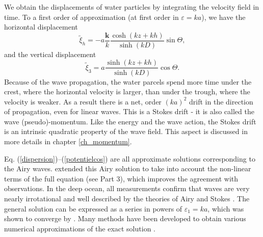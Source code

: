 We obtain the displacements of water particles by integrating the velocity field in 
time. To a first order of approximation (at first order in $\varepsilon=ka$),
we have the horizontal displacement
\begin{equation}
     \widetilde{\xi}_h = - a \frac{{\mathbf k}}{k}
    \frac{\cosh\left(kz+kh\right)}{\sinh\left(kD\right)}
    \sin \Theta,
      \label{xi1}
\end{equation} and the vertical displacement
\begin{equation}
    \widetilde{\xi}_3 =a
    \frac{\sinh\left(kz+kh\right)}{\sinh\left(kD\right)}
    \cos \Theta \label{xi3}.
\end{equation}
Because of the wave propagation, the water parcels spend more time under the crest, where the horizontal 
velocity is larger, than under the trough, where the velocity is weaker. As a result there is a net, order $(ka)^2$ drift in the direction 
of propagation, even for linear waves. This is a Stokes drift - it is also called the wave (pseudo)-momentum. Like the energy and the wave action, the Stokes 
drift is an intrinsic quadratic property 
of the wave field. This aspect is discussed in more details in chapter \ref{ch_momentum}. 

Eq. (\ref{dispersion})--(\ref{potentielcos}) are all approximate solutions corresponding to the Airy waves. \cite{Stokes1849} extended this Airy solution 
to take into account the non-linear terms of the full equation (see Part 3), which improves the agreement with observations.
In the deep ocean, all measurements confirm that waves are very nearly irrotational and well described
by the theories of Airy and Stokes
\citep[see for example ][]{Thornton&Kraphol1974,Herbers&al.1992}. The general solution can be expressed as a 
series in powers of 
$\varepsilon_1=ka$, which was shown to converge by \cite{Levi-Civita1925}. Many methods have been developed to 
obtain various numerical approximations of the exact solution \citep{Dalrymple1974}.

